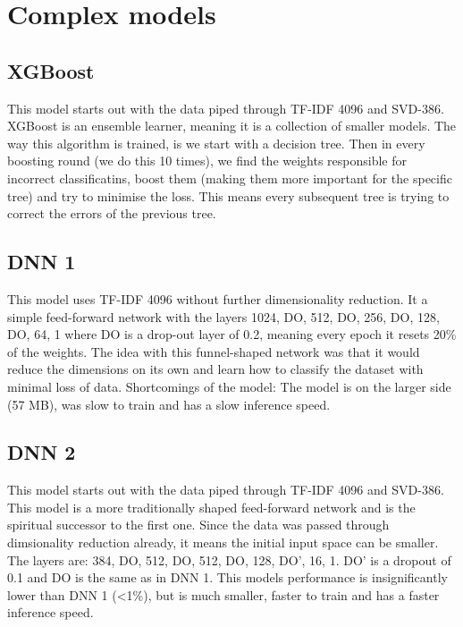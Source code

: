 \section{Complex models}
\subsection{XGBoost}
This model starts out with the data piped through TF-IDF 4096 and SVD-386. XGBoost is an ensemble learner, meaning it is a collection of smaller models. The way this algorithm is trained, is we start with a decision tree. Then in every boosting round (we do this 10 times), we find the weights responsible for incorrect classificatins, boost them (making them more important for the specific tree) and try to minimise the loss. This means every subsequent tree is trying to correct the errors of the previous tree.

\subsection{DNN 1}
This model uses TF-IDF 4096 without further dimensionality reduction. It a simple feed-forward network with the layers 1024, DO, 512, DO, 256, DO, 128, DO, 64, 1 where DO is a drop-out layer of 0.2, meaning every epoch it resets 20\% of the weights. The idea with this funnel-shaped network was that it would reduce the dimensions on its own and learn how to classify the dataset with minimal loss of data. Shortcomings of the model: The model is on the larger side (57 MB), was slow to train and has a slow inference speed.

\subsection{DNN 2}
This model starts out with the data piped through TF-IDF 4096 and SVD-386. This model is a more traditionally shaped feed-forward network and is the spiritual successor to the first one. Since the data was passed through dimsionality reduction already, it means the initial input space can be smaller. The layers are: 384, DO, 512, DO, 512, DO, 128, DO', 16, 1. DO' is a dropout of 0.1 and DO is the same as in DNN 1. This models performance is insignificantly lower than DNN 1 (<1\%), but is much smaller, faster to train and has a faster inference speed.

